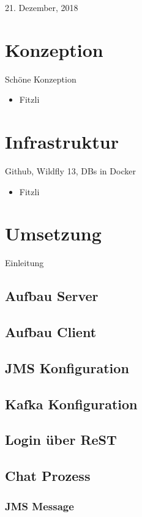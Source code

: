 \documentclass[10pt,journal,compsoc]{IEEEtran}
\begin{document}
\hfill 21. Dezember, 2018

\section{Konzeption}
Schöne Konzeption
\begin{itemize}
	\item Fitzli
\end{itemize}

\section{Infrastruktur}
Github, Wildfly 13, DBs in Docker
\begin{itemize}
	\item Fitzli
\end{itemize}

\section{Umsetzung}
Einleitung
\subsection{Aufbau Server}
\subsection{Aufbau Client}
\subsection{JMS Konfiguration}
\subsection{Kafka Konfiguration}
\subsection{Login über ReST}
\subsection{Chat Prozess}
\subsubsection{JMS Message}
\end{document}

